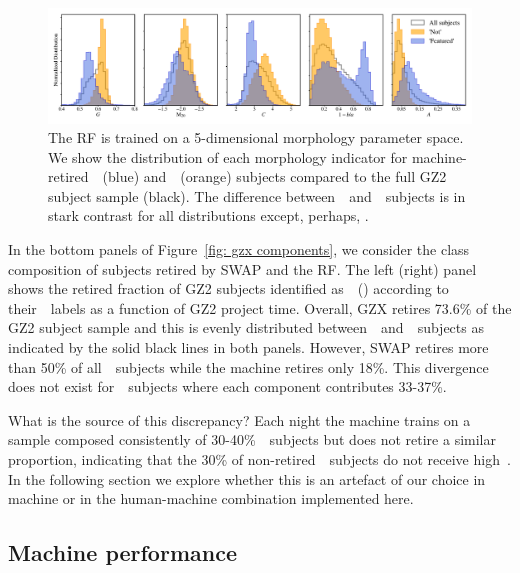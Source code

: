 \begin{figure}[t!]
\centering
\includegraphics[width=7in]{Figures/human_machine/f10.pdf}
\caption[Distributions of measured galaxy morphology features.]{The RF is trained on a 5-dimensional morphology parameter space. We show the distribution of each morphology indicator for machine-retired~\feat~(blue) and~\notfeat~(orange) subjects compared to the full GZ2 subject sample (black). The difference between~\feat~and~\notfeat~subjects is in stark contrast for all distributions except, perhaps, .  \label{fig: morph params}}
\end{figure}

In the bottom panels of Figure~\ref{fig: gzx components}, we consider the class
composition of subjects retired by SWAP and the RF. 
The left (right) panel shows the retired fraction of GZ2 subjects identified 
as~\feat~(\notfeat) according to their~\raw~labels as a function of GZ2 project time. 
Overall, GZX retires 73.6\% of the GZ2 subject sample and this is evenly 
distributed between~\feat~and~\notfeat~subjects as indicated by the solid
black lines in both panels. 
However, SWAP retires more than 50\% of all~\feat~subjects while the machine
retires only 18\%. This divergence does not exist for~\notfeat~subjects where
each component contributes 33-37\%. 

What is the source of this discrepancy? 
Each night the machine trains on a sample composed consistently of 30-40\%~\feat~subjects but does not retire a similar proportion, indicating
that the 30\% of non-retired~\feat~subjects do not receive high~\pmachine. 
In the following section we explore whether this is an artefact of our choice in machine 
or in the human-machine combination implemented here. 

\subsection{Machine performance}\label{sec: machine performance}

